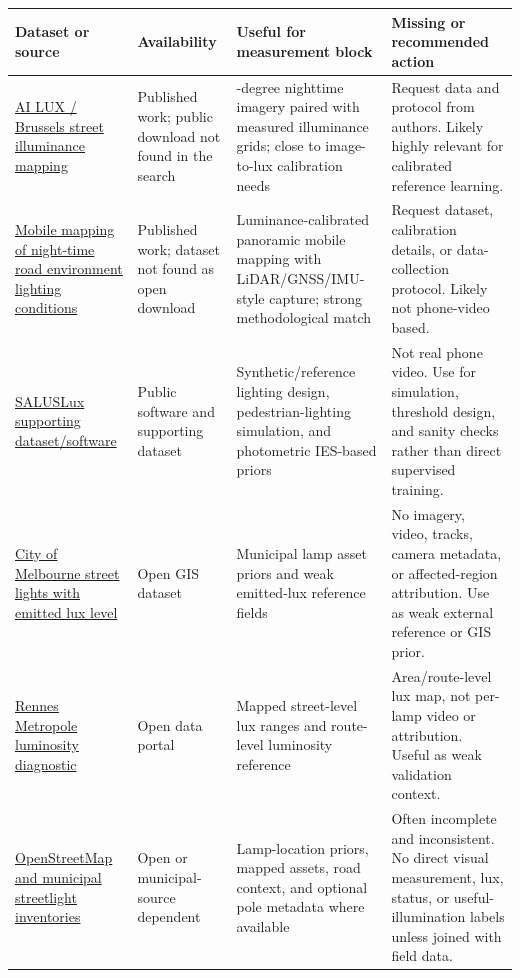 \documentclass[11pt]{article}
\begin{document}
\begin{center}
\begin{tabularx}{\textwidth}{>{\raggedright\arraybackslash}p{}>{\raggedright\arraybackslash}p{}>{\raggedright\arraybackslash}X>{\raggedright\arraybackslash}p{}}
\toprule
Dataset or source & Availability & Useful for measurement block & Missing or recommended action \\
\midrule
\href{https://www.researchgate.net/publication/398053026_Mapping_street_lighting_Illuminance_characterization_in_urban_squares_in_the_Brussels_Capital_Region}{AI LUX / Brussels street illuminance mapping} & Published work; public download not found in the search & 360-degree nighttime imagery paired with measured illuminance grids; close to image-to-lux calibration needs & Request data and protocol from authors. Likely highly relevant for calibrated reference learning. \\
\href{https://research.utwente.nl/en/publications/mobile-mapping-of-night-time-road-environment-lighting-conditions}{Mobile mapping of night-time road environment lighting conditions} & Published work; dataset not found as open download & Luminance-calibrated panoramic mobile mapping with LiDAR/GNSS/IMU-style capture; strong methodological match & Request dataset, calibration details, or data-collection protocol. Likely not phone-video based. \\
\href{https://rosap.ntl.bts.gov/view/dot/86187}{SALUSLux supporting dataset/software} & Public software and supporting dataset & Synthetic/reference lighting design, pedestrian-lighting simulation, and photometric IES-based priors & Not real phone video. Use for simulation, threshold design, and sanity checks rather than direct supervised training. \\
\href{https://discover.data.vic.gov.au/dataset/street-lights-with-emitted-lux-level-council-owned-lights-only}{City of Melbourne street lights with emitted lux level} & Open GIS dataset & Municipal lamp asset priors and weak emitted-lux reference fields & No imagery, video, tracks, camera metadata, or affected-region attribution. Use as weak external reference or GIS prior. \\
\href{https://www.data.gouv.fr/datasets/diagnostic-de-la-luminosite-sur-rennes-metropole/}{Rennes Metropole luminosity diagnostic} & Open data portal & Mapped street-level lux ranges and route-level luminosity reference & Area/route-level lux map, not per-lamp video or attribution. Useful as weak validation context. \\
\href{https://www.openstreetmap.org/}{OpenStreetMap and municipal streetlight inventories} & Open or municipal-source dependent & Lamp-location priors, mapped assets, road context, and optional pole metadata where available & Often incomplete and inconsistent. No direct visual measurement, lux, status, or useful-illumination labels unless joined with field data. \\
\bottomrule
\end{tabularx}
\end{center}
\end{document}

